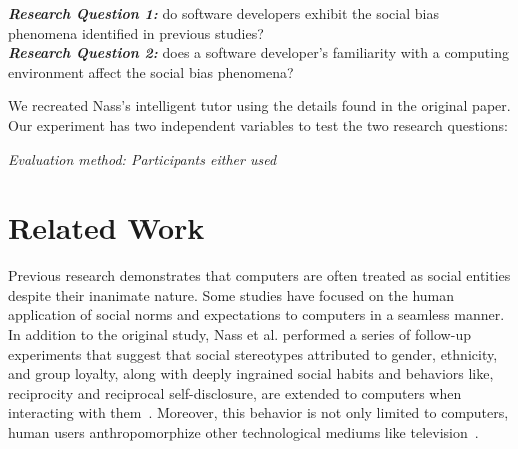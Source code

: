 \documentclass{sig-alternate-05-2015}
\begin{document}
\noindent \textbf{\emph{Research Question 1:}} do software developers exhibit the social bias phenomena identified in previous studies?\\

\noindent \textbf{\emph{Research Question 2:}} does a software developer's familiarity with a computing environment affect the social bias phenomena?\\

We recreated Nass's intelligent tutor using the details found in the original paper. Our experiment has two independent variables to test the two research questions:\\
\begin{enumerate*}
    \item{\emph{Evaluation method: Participants either used}}

\end{enumerate*}

\section{Related Work}
Previous research demonstrates that computers are often treated as social entities despite their inanimate nature. Some studies have focused on the human application of social norms and expectations to computers in a seamless manner. In addition to the original study, Nass et al. performed a series of follow-up experiments that suggest that social stereotypes attributed to gender, ethnicity, and group loyalty, along with deeply ingrained social habits and behaviors like, reciprocity and reciprocal self-disclosure, are extended to computers when interacting with them~\cite{Nass2000machines,nass1999people}. Moreover, this behavior is not only limited to computers, human users anthropomorphize other technological mediums like television~\cite{reeves1996people}.
\end{document}

